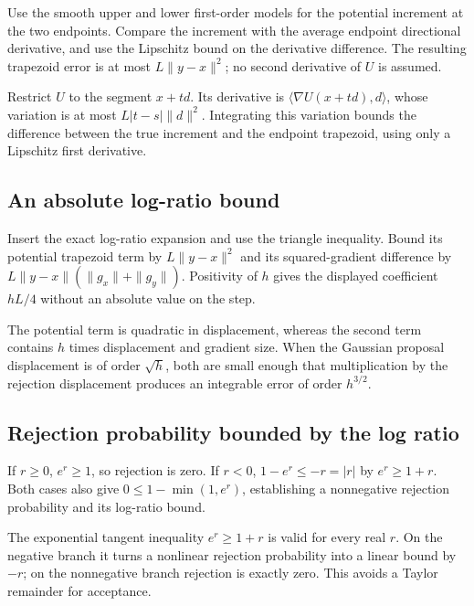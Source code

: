 \documentclass[11pt,a4paper]{article}
\begin{document}
Use the smooth upper and lower first-order models for the potential increment at the two endpoints. Compare the increment with the average endpoint directional derivative, and use the Lipschitz bound on the derivative difference. The resulting trapezoid error is at most \(L\|y-x\|^2\); no second derivative of \(U\) is assumed.



Restrict \(U\) to the segment \(x+td\). Its derivative is \(\langle\nabla U(x+td),d\rangle\), whose variation is at most \(L|t-s|\|d\|^2\). Integrating this variation bounds the difference between the true increment and the endpoint trapezoid, using only a Lipschitz first derivative.


\subsection{\texorpdfstring{An absolute log-ratio bound}{An absolute log-ratio bound}}


Insert the exact log-ratio expansion and use the triangle inequality. Bound its potential trapezoid term by \(L\|y-x\|^2\) and its squared-gradient difference by \(L\|y-x\|(\|g_x\|+\|g_y\|)\). Positivity of \(h\) gives the displayed coefficient \(hL/4\) without an absolute value on the step.



The potential term is quadratic in displacement, whereas the second term contains \(h\) times displacement and gradient size. When the Gaussian proposal displacement is of order \(\sqrt h\), both are small enough that multiplication by the rejection displacement produces an integrable error of order \(h^{3/2}\).


\subsection{\texorpdfstring{Rejection probability bounded by the log ratio}{Rejection probability bounded by the log ratio}}


If \(r\ge0\), \(e^r\ge1\), so rejection is zero. If \(r<0\), \(1-e^r\le-r=|r|\) by \(e^r\ge1+r\). Both cases also give \(0\le1-\min(1,e^r)\), establishing a nonnegative rejection probability and its log-ratio bound.



The exponential tangent inequality \(e^r\ge1+r\) is valid for every real \(r\). On the negative branch it turns a nonlinear rejection probability into a linear bound by \(-r\); on the nonnegative branch rejection is exactly zero. This avoids a Taylor remainder for acceptance.
\end{document}
